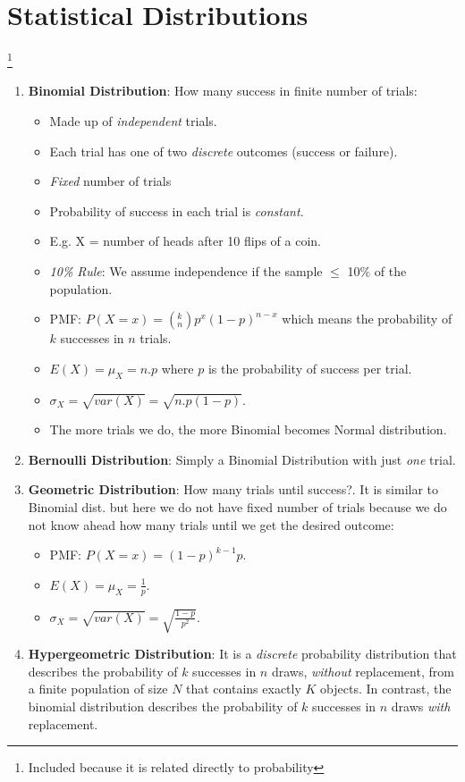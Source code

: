 \documentclass[11pt, twocolumn]{article}
\begin{document}
\section{Statistical Distributions}\footnote{Included because it is related directly to probability}
\begin{enumerate}
\item \textbf{Binomial Distribution}: How many success in finite number of trials:
	\begin{itemize}
	\item Made up of \textit{independent} trials.
	\item Each trial has one of two \textit{discrete} outcomes (success or failure).
	\item \textit{Fixed} number of trials
	\item Probability of success in each trial is \textit{constant}.
	\item E.g. X = number of heads after 10 flips of a coin.	
	\item \textit{10\% Rule}: We assume independence if the sample $\leq$ 10\% of the population.
	\item PMF: $P(X = x) = (_{n}^{k}) p^x (1 - p)^{n-x}$ which means the probability of $k$ successes in $n$ trials.
	\item $E(X) = \mu_X = n . p$ where $p$ is the probability of success per trial.
	\item $\sigma_X = \sqrt{var(X)} = \sqrt{n . p (1 - p)}$.
	\item The more trials we do, the more Binomial becomes Normal distribution.
	\end{itemize} 

\item \textbf{Bernoulli Distribution}: Simply a Binomial Distribution with just \textit{one} trial. 
\item \textbf{Geometric Distribution}: How many trials until success?. It is similar to Binomial dist. but here we do not have fixed number of trials because we do not know ahead how many trials until we get the desired outcome:
	\begin{itemize}
	\item PMF: $P(X = x) = (1 - p)^{k - 1} p$.
	\item $E(X) = \mu_X = \frac{1}{p}$.
	\item $\sigma_X = \sqrt{var(X)} = \sqrt{\frac{1 - p}{p^2}}$.
	\end{itemize} 

\item \textbf{Hypergeometric Distribution}: It is a \textit{discrete} probability distribution that describes the probability of $k$ successes in $n$ draws, \textit{without} replacement, from a finite population of size $N$ that contains exactly $K$ objects. In contrast, the binomial distribution describes the probability of $k$ successes in $n$ draws \textit{with} replacement. 
	

\end{enumerate}
\end{document}
